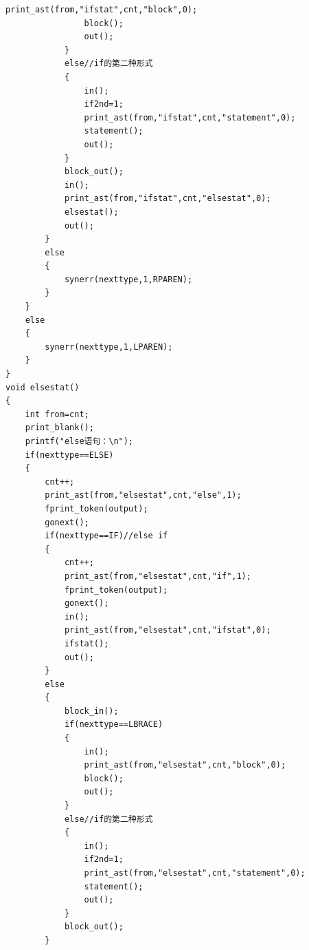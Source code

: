 \documentclass[supercite]{Experimental_Report}
\theoremstyle{definition}
\begin{document}
\begin{lstlisting}[title=parser\_func,frame=none]
				print_ast(from,"ifstat",cnt,"block",0);
				block();
				out();	
			}
			else//if的第二种形式 
			{
				in();
				if2nd=1;
				print_ast(from,"ifstat",cnt,"statement",0);
				statement();
				out();
			}
			block_out();
			in();
			print_ast(from,"ifstat",cnt,"elsestat",0);
			elsestat();
			out();
		}
		else
		{
			synerr(nexttype,1,RPAREN);
		}
	}
	else
	{
		synerr(nexttype,1,LPAREN);
	}
}
void elsestat()
{
	int from=cnt;
	print_blank();
	printf("else语句：\n");
	if(nexttype==ELSE)
	{
		cnt++;
		print_ast(from,"elsestat",cnt,"else",1);
		fprint_token(output);
		gonext();
		if(nexttype==IF)//else if
		{
			cnt++;
			print_ast(from,"elsestat",cnt,"if",1);
			fprint_token(output);
			gonext();
			in();
			print_ast(from,"elsestat",cnt,"ifstat",0);
			ifstat();
			out();
		}
		else
		{
			block_in();
			if(nexttype==LBRACE)
			{
				in();
				print_ast(from,"elsestat",cnt,"block",0);
				block();
				out();	
			}
			else//if的第二种形式 
			{
				in();
				if2nd=1;
				print_ast(from,"elsestat",cnt,"statement",0);
				statement();
				out();
			}
			block_out();
		}


\end{lstlisting}
\end{document}
